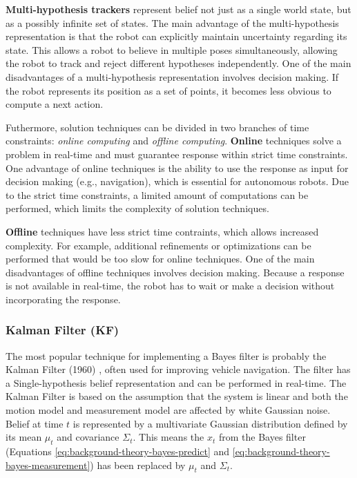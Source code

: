 \textbf{Multi-hypothesis trackers} represent belief not just as a single world state, but as a possibly infinite set of states.
The main advantage of the multi-hypothesis representation is that the robot can explicitly maintain uncertainty regarding its state.
This allows a robot to believe in multiple poses simultaneously, allowing the robot to track and reject different hypotheses independently.
One of the main disadvantages of a multi-hypothesis representation involves decision making.
If the robot represents its position as a set of points, it becomes less obvious to compute a next action.

Futhermore, solution techniques can be divided in two branches of time constraints: \textit{online computing} and \textit{offline computing}.
\textbf{Online} techniques solve a problem in real-time and must guarantee response within strict time constraints.
One advantage of online techniques is the ability to use the response as input for decision making (e.g., navigation), which is essential for autonomous robots.
Due to the strict time constraints, a limited amount of computations can be performed, which limits the complexity of solution techniques.

\textbf{Offline} techniques have less strict time contraints, which allows increased complexity.
For example, additional refinements or optimizations can be performed that would be too slow for online techniques.
One of the main disadvantages of offline techniques involves decision making.
Because a response is not available in real-time, the robot has to wait or make a decision without incorporating the response.


\subsubsection{Kalman Filter (KF)}
\label{sec:prob-rob-kf}
The most popular technique for implementing a Bayes filter is probably the Kalman Filter (1960) \cite{kalman1960new}, often used for improving vehicle navigation.
The filter has a Single-hypothesis belief representation and can be performed in real-time.
The Kalman Filter is based on the assumption that the system is linear and both the motion model and measurement model are affected by white Gaussian noise.
Belief at time $t$ is represented by a multivariate Gaussian distribution defined by its mean $\mu_t$ and covariance $\Sigma_t$.
This means the $x_t$ from the Bayes filter (Equations \eqref{eq:background-theory-bayes-predict} and \eqref{eq:background-theory-bayes-measurement}) has been replaced by $\mu_t$ and $\Sigma_t$.

